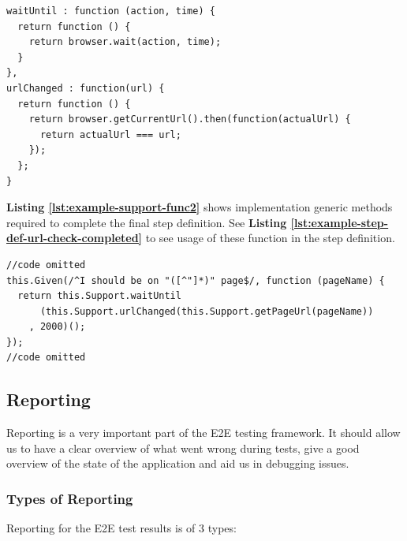 \begin{listing}[H]
\begin{verbatim}
waitUntil : function (action, time) {
  return function () {
    return browser.wait(action, time);
  }
},
urlChanged : function(url) {
  return function () {
    return browser.getCurrentUrl().then(function(actualUrl) {
      return actualUrl === url;
    });
  };
}
\end{verbatim}
\label{lst:example-support-func2}
\end{listing}

\textbf{Listing \ref{lst:example-support-func2}} shows implementation generic methods required to complete the final step definition. See \textbf{Listing \ref{lst:example-step-def-url-check-completed}} to see usage of these function in the step definition.

\begin{listing}[H]
\begin{verbatim}
//code omitted
this.Given(/^I should be on "([^"]*)" page$/, function (pageName) {
  return this.Support.waitUntil
      (this.Support.urlChanged(this.Support.getPageUrl(pageName))
    , 2000)();
});
//code omitted
\end{verbatim}
\label{lst:example-step-def-url-check-completed}
\end{listing}

\subsection{Reporting}
\label{subsec:reporting}

Reporting is a very important part of the E2E testing framework. It should allow us to have a clear overview of what went wrong during tests, give a good overview of the state of the application and aid us in debugging issues.

\subsubsection{Types of Reporting}
\label{subsubsec:types-of-reporting}

Reporting for the E2E test results is of 3 types:

